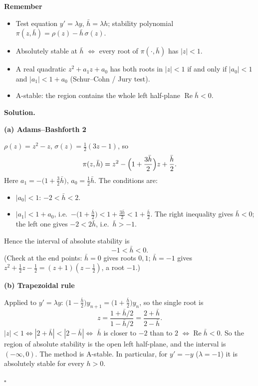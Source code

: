 \documentclass[11pt,a4paper]{article}
\newenvironment{rem}
  {\begin{remember}\noindent\textbf{Remember}\par\nobreak\vspace{-0.3em}}
  {\end{remember}}
\newenvironment{solution}
  {\par\noindent\textbf{Solution.}\par\nobreak}
  {\par\nobreak\noindent\hfill\(\square\)\par}
\newcommand{\step}[1]{\par\addvspace{0.5em}\noindent\textbf{#1}\par\nobreak}
\newcommand{\hb}{\bar h}
\begin{document}
\begin{rem}
\begin{itemize}
  \item Test equation \(y'=\lambda y\), \(\hb=\lambda h\);
    stability polynomial \(\pi(z,\hb)=\rho(z)-\hb\,\sigma(z)\).
  \item Absolutely stable at \(\hb\) \(\iff\) every root of
    \(\pi(\cdot,\hb)\) has \(|z|<1\).
  \item A real quadratic \(z^2+a_1z+a_0\) has both roots in \(|z|<1\)
    if and only if \(|a_0|<1\) and \(|a_1|<1+a_0\) (Schur--Cohn /
    Jury test).
  \item A-stable: the region contains the whole left half-plane
    \(\operatorname{Re}\hb<0\).
\end{itemize}
\end{rem}

\begin{solution}
\step{(a) Adams--Bashforth 2}
\(\rho(z)=z^2-z\), \(\sigma(z)=\frac12(3z-1)\), so
\[
  \pi(z,\hb)=z^2-\Bigl(1+\frac{3\hb}2\Bigr)z+\frac{\hb}2 .
\]
Here \(a_1=-\bigl(1+\frac32\hb\bigr)\), \(a_0=\frac12\hb\).  The
conditions are:
\begin{itemize}
  \item \(|a_0|<1\): \(-2<\hb<2\).
  \item \(|a_1|<1+a_0\), i.e.\
    \(-\bigl(1+\frac{\hb}2\bigr)<1+\frac{3\hb}2<1+\frac{\hb}2\).
    The right inequality gives \(\hb<0\); the left one gives
    \(-2<2\hb\), i.e.\ \(\hb>-1\).
\end{itemize}
Hence the interval of absolute stability is
\[
  \boxed{-1<\hb<0}.
\]
(Check at the end points: \(\hb=0\) gives roots \(0,1\);
\(\hb=-1\) gives \(z^2+\frac12z-\frac12=(z+1)(z-\frac12)\), a root
\(-1\).)

\step{(b) Trapezoidal rule}
Applied to \(y'=\lambda y\):
\(\bigl(1-\frac{\hb}2\bigr)y_{n+1}=\bigl(1+\frac{\hb}2\bigr)y_n\), so
the single root is
\[
  z=\frac{1+\hb/2}{1-\hb/2}=\frac{2+\hb}{2-\hb}.
\]
\(|z|<1\iff|2+\hb|<|2-\hb|\iff\) \(\hb\) is closer to \(-2\) than to
\(2\) \(\iff\operatorname{Re}\hb<0\).  So the region of absolute
stability is the open left half-plane, and the interval is
\((-\infty,0)\).  The method is A-stable.  In particular, for
\(y'=-y\) (\(\lambda=-1\)) it is absolutely stable for every \(h>0\).
\end{solution}
\end{document}

